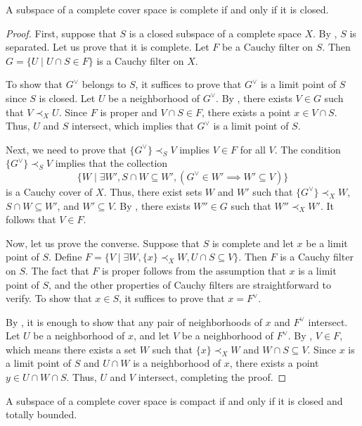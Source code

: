 \documentclass[pdflatex,sn-mathphys-num]{sn-jnl}
\theoremstyle{definition}
\theoremstyle{remark}
\numberwithin{figure}{section}
\newcommand{\rb}{\prec}
\begin{document}
\begin{prop}
A subspace of a complete cover space is complete if and only if it is closed.
\end{prop}
\begin{proof}
First, suppose that $S$ is a closed subspace of a complete space $X$.
By , $S$ is separated.
Let us prove that it is complete.
Let $F$ be a Cauchy filter on $S$.
Then $G = \{ U \mid U \cap S \in F \}$ is a Cauchy filter on $X$.

To show that $G^\vee$ belongs to $S$, it suffices to prove that $G^\vee$ is a limit point of $S$ since $S$ is closed.
Let $U$ be a neighborhood of $G^\vee$.
By , there exists $V \in G$ such that $V \rb_X U$.
Since $F$ is proper and $V \cap S \in F$, there exists a point $x \in V \cap S$.
Thus, $U$ and $S$ intersect, which implies that $G^\vee$ is a limit point of $S$.

Next, we need to prove that $\{ G^\vee \} \rb_S V$ implies $V \in F$ for all $V$.
The condition $\{ G^\vee \} \rb_S V$ implies that the collection
\[ \{ W \mid \exists W', S \cap W \subseteq W', (G^\vee \in W' \implies W' \subseteq V) \} \]
is a Cauchy cover of $X$.
Thus, there exist sets $W$ and $W'$ such that $\{ G^\vee \} \rb_X W$, $S \cap W \subseteq W'$, and $W' \subseteq V$.
By , there exists $W'' \in G$ such that $W'' \rb_X W'$.
It follows that $V \in F$.

Now, let us prove the converse.
Suppose that $S$ is complete and let $x$ be a limit point of $S$.
Define $F = \{ V \mid \exists W, \{ x \} \rb_X W, U \cap S \subseteq V \}$.
Then $F$ is a Cauchy filter on $S$.
The fact that $F$ is proper follows from the assumption that $x$ is a limit point of $S$, and the other properties of Cauchy filters are straightforward to verify.
To show that $x \in S$, it suffices to prove that $x = F^\vee$.

By , it is enough to show that any pair of neighborhoods of $x$ and $F^\vee$ intersect.
Let $U$ be a neighborhood of $x$, and let $V$ be a neighborhood of $F^\vee$.
By , $V \in F$, which means there exists a set $W$ such that $\{ x \} \rb_X W$ and $W \cap S \subseteq V$.
Since $x$ is a limit point of $S$ and $U \cap W$ is a neighborhood of $x$, there exists a point $y \in U \cap W \cap S$.
Thus, $U$ and $V$ intersect, completing the proof.
\end{proof}

\begin{cor}
A subspace of a complete cover space is compact if and only if it is closed and totally bounded.
\end{cor}
\end{document}
